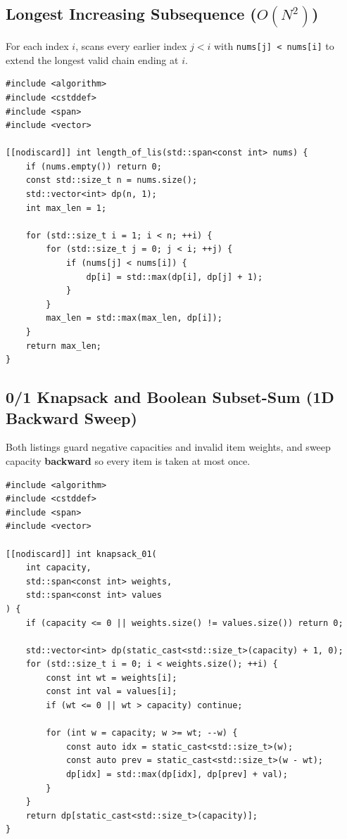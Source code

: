 \documentclass[11pt,a4paper]{article}
\theoremstyle{definition}
\begin{document}
\subsection{Longest Increasing Subsequence (\texorpdfstring{$O(N^2)$}{O(N^2)})}
For each index $i$, scans every earlier index $j < i$ with \texttt{nums[j] < nums[i]} to extend the longest valid chain ending at $i$.

\begin{lstlisting}[caption={Longest Increasing Subsequence in $O(N^2)$ time}]
#include <algorithm>
#include <cstddef>
#include <span>
#include <vector>

[[nodiscard]] int length_of_lis(std::span<const int> nums) {
    if (nums.empty()) return 0;
    const std::size_t n = nums.size();
    std::vector<int> dp(n, 1);
    int max_len = 1;

    for (std::size_t i = 1; i < n; ++i) {
        for (std::size_t j = 0; j < i; ++j) {
            if (nums[j] < nums[i]) {
                dp[i] = std::max(dp[i], dp[j] + 1);
            }
        }
        max_len = std::max(max_len, dp[i]);
    }
    return max_len;
}
\end{lstlisting}

\subsection{0/1 Knapsack and Boolean Subset-Sum (1D Backward Sweep)}
Both listings guard negative capacities and invalid item weights, and sweep capacity \textbf{backward} so every item is taken at most once.

\begin{lstlisting}[caption={0/1 Knapsack space-optimized to a 1D backward loop}]
#include <algorithm>
#include <cstddef>
#include <span>
#include <vector>

[[nodiscard]] int knapsack_01(
    int capacity,
    std::span<const int> weights,
    std::span<const int> values
) {
    if (capacity <= 0 || weights.size() != values.size()) return 0;

    std::vector<int> dp(static_cast<std::size_t>(capacity) + 1, 0);
    for (std::size_t i = 0; i < weights.size(); ++i) {
        const int wt = weights[i];
        const int val = values[i];
        if (wt <= 0 || wt > capacity) continue;

        for (int w = capacity; w >= wt; --w) {
            const auto idx = static_cast<std::size_t>(w);
            const auto prev = static_cast<std::size_t>(w - wt);
            dp[idx] = std::max(dp[idx], dp[prev] + val);
        }
    }
    return dp[static_cast<std::size_t>(capacity)];
}
\end{lstlisting}
\end{document}
